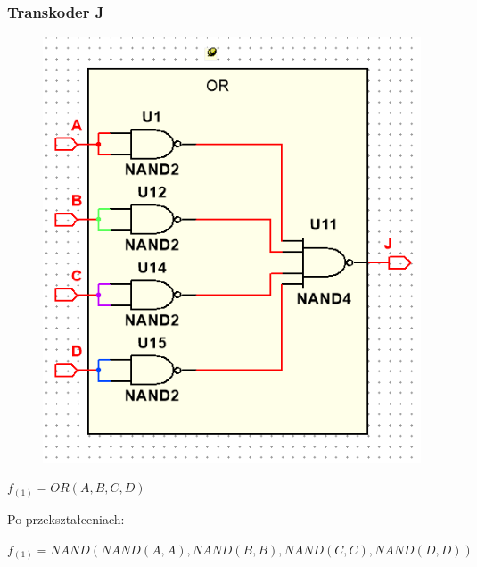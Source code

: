\documentclass[a4paper]{article}
\begin{document}
\subsubsection{Transkoder J}
 \begin{figure}[H]
  \centering
  \includegraphics{schemat_J.png}
\end{figure}

\begin{center}
  $f_{(1)} = OR(A,B,C,D) $
\end{center}
Po przekształceniach:
\begin{center}
  $ f_{(1)} = NAND(NAND(A,A),NAND(B,B),NAND(C,C),NAND(D,D))$
\end{center}
\end{document}
